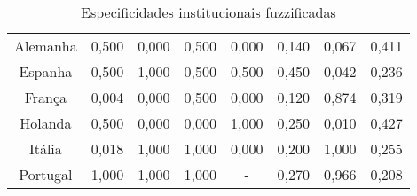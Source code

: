 \begin{table}
\centering
\caption{Especificidades institucionais fuzzificadas}
\label{tab::fuzzyficada}
\begin{tabular}{cccccccc}
\toprule
Alemanha & 0,500 & 0,000 & 0,500 & 0,000 & 0,140 & 0,067 & 0,411 \\
Espanha  & 0,500 & 1,000 & 0,500 & 0,500 & 0,450 & 0,042 & 0,236 \\
França   & 0,004 & 0,000 & 0,500 & 0,000 & 0,120 & 0,874 & 0,319 \\
Holanda  & 0,500 & 0,000 & 0,000 & 1,000 & 0,250 & 0,010 & 0,427 \\
Itália   & 0,018 & 1,000 & 1,000 & 0,000 & 0,200 & 1,000 & 0,255 \\
Portugal & 1,000 & 1,000 & 1,000 &     - & 0,270 & 0,966 & 0,208 \\
\bottomrule
\end{tabular}
\end{table}
